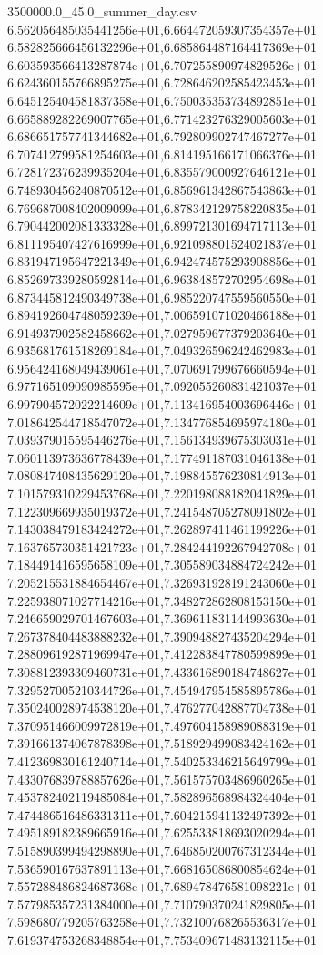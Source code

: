 \begin{filecontents*}{3500000.0_45.0_summer_day.csv}
6.562056485035441256e+01,6.664472059307354357e+01
6.582825666456132296e+01,6.685864487164417369e+01
6.603593566413287874e+01,6.707255890974829526e+01
6.624360155766895275e+01,6.728646202585423453e+01
6.645125404581837358e+01,6.750035353734892851e+01
6.665889282269007765e+01,6.771423276329005603e+01
6.686651757741344682e+01,6.792809902747467277e+01
6.707412799581254603e+01,6.814195166171066376e+01
6.728172376239935204e+01,6.835579000927646121e+01
6.748930456240870512e+01,6.856961342867543863e+01
6.769687008402009099e+01,6.878342129758220835e+01
6.790442002081333328e+01,6.899721301694717113e+01
6.811195407427616999e+01,6.921098801524021837e+01
6.831947195647221349e+01,6.942474575293908856e+01
6.852697339280592814e+01,6.963848572702954698e+01
6.873445812490349738e+01,6.985220747559560550e+01
6.894192604748059239e+01,7.006591071020466188e+01
6.914937902582458662e+01,7.027959677379203640e+01
6.935681761518269184e+01,7.049326596242462983e+01
6.956424168049439061e+01,7.070691799676660594e+01
6.977165109090985595e+01,7.092055260831421037e+01
6.997904572022214609e+01,7.113416954003696446e+01
7.018642544718547072e+01,7.134776854695974180e+01
7.039379015595446276e+01,7.156134939675303031e+01
7.060113973636778439e+01,7.177491187031046138e+01
7.080847408435629120e+01,7.198845576230814913e+01
7.101579310229453768e+01,7.220198088182041829e+01
7.122309669935019372e+01,7.241548705278091802e+01
7.143038479183424272e+01,7.262897411461199226e+01
7.163765730351421723e+01,7.284244192267942708e+01
7.184491416595658109e+01,7.305589034884724242e+01
7.205215531884654467e+01,7.326931928191243060e+01
7.225938071027714216e+01,7.348272862808153150e+01
7.246659029701467603e+01,7.369611831144993630e+01
7.267378404483888232e+01,7.390948827435204294e+01
7.288096192871969947e+01,7.412283847780599899e+01
7.308812393309460731e+01,7.433616890184748627e+01
7.329527005210344726e+01,7.454947954585895786e+01
7.350240028974538120e+01,7.476277042887704738e+01
7.370951466009972819e+01,7.497604158989088319e+01
7.391661374067878398e+01,7.518929499083424162e+01
7.412369830161240714e+01,7.540253346215649799e+01
7.433076839788857626e+01,7.561575703486960265e+01
7.453782402119485084e+01,7.582896568984324404e+01
7.474486516486331311e+01,7.604215941132497392e+01
7.495189182389665916e+01,7.625533818693020294e+01
7.515890399494298890e+01,7.646850200767312344e+01
7.536590167637891113e+01,7.668165086800854624e+01
7.557288486824687368e+01,7.689478476581098221e+01
7.577985357231384000e+01,7.710790370241829805e+01
7.598680779205763258e+01,7.732100768265536317e+01
7.619374753268348854e+01,7.753409671483132115e+01

\end{filecontents*}
